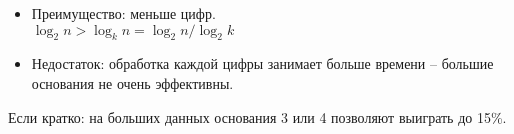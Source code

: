\begin{frame}[fragile]{}
\begin{itemize}
    \item Преимущество: меньше цифр. \\$\log_2 n > \log_k n = \log_2 n /
    \log_2 k$
    \item Недостаток: обработка каждой цифры занимает больше времени -- большие основания  не очень эффективны.
\end{itemize}

Если кратко: на больших данных основания 3 или 4 позволяют выиграть до 15\%.
\end{frame}

\begin{comment}

\begin{frame}[fragile]{}
Преимущество при использовании оснований больше двойки заключается в
том, что для представления каждого числа требуется меньше цифр. В то
время как число по основанию 2 содержит примерно $\log_2 n$ цифр,
число по основанию $k$ содержит приблизительно $\log_k n = \log_2 n /
\log_2 k$ цифр. Например, при основании 4 нужно примерно вдвое меньше
цифр, чем при основании 2. 

С другой стороны, теперь для каждой цифры
имеется больше возможных значений, так что обработка каждой цифры
может отнимать больше времени. В числовых представлениях обработка
одной цифры по основанию $k$ часто требует примерно $k+1$ шагов, так
что операция, затрагивающая каждую цифру, должна отнимать примерно
$(k+1) \log_k n = \frac{k+1}{\log_2 k} \log n$ шагов. В следующей
таблице приведены значения $(k + 1) / \log_2 k$ для $k = 2, \ldots,
8$.\\
\begin{tabular}{c|ccccccc}
  $k$ & 2 & 3 & 4 & 5 & 6 & 7 & 8 \\
$(k + 1) / \log_2 k$ &
   3.00 & 2.52 & 2.50 & 2.58 & 2.71 & 2.85 & 3.0 \\
\end{tabular}
\\
По этой таблице можно заключить, что числовые представления,
основанные на троичных или четверичных числах, могут выигрывать до
16\% у числовых представлений на основе двоичных чисел. Другие
факторы, например, размер кода, часто делают большие основания менее
эффективными при увеличении $k$, так что настолько большие ускорения
редко встречаются на практике. Более того, троичные и четверичные
представления на маленьких объемах данных часто работают хуже, чем
двоичные представления. Однако для больших объемов данных троичные и
четверичные представления часто приносят ускорение от 5 до 10\%.
\end{frame}
\end{comment}

